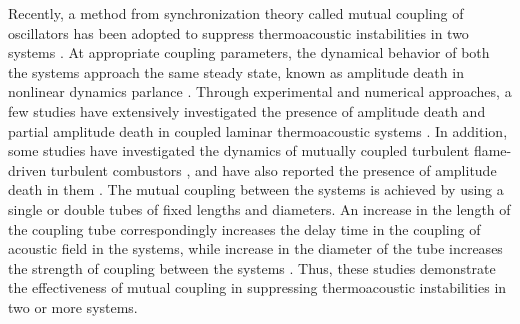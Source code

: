 \documentclass[twocolumn,10pt]{article} %
\begin{document}
Recently, a method from synchronization theory called mutual coupling of oscillators has been adopted to suppress thermoacoustic instabilities in two systems \cite{sujith2021thermoacoustic}. At appropriate coupling parameters, the dynamical behavior of both the systems approach the same steady state, known as amplitude death in nonlinear dynamics parlance \cite{zou2021quenching}. Through experimental and numerical approaches, a few studies have extensively investigated the presence of amplitude death and partial amplitude death in coupled laminar thermoacoustic systems \cite{thomas2018effect, dange2019oscillation, sahay2021dynamics, srikanth2021dynamical, hyodo2020suppression}. In addition, some studies have investigated the dynamics of mutually coupled turbulent flame-driven turbulent combustors \cite{jegal2019mutual, moon2020mutual, guan2021low}, and have also reported the presence of amplitude death in them \cite{jegal2019mutual}. The mutual coupling between the systems is achieved by using a single or double tubes of fixed lengths and diameters. An increase in the length of the coupling tube correspondingly increases the delay time in the coupling of acoustic field in the systems, while increase in the diameter of the tube increases the strength of coupling between the systems \cite{dange2019oscillation, sahay2021dynamics}. Thus, these studies demonstrate the effectiveness of mutual coupling in suppressing thermoacoustic instabilities in two or more systems. 
\end{document}
